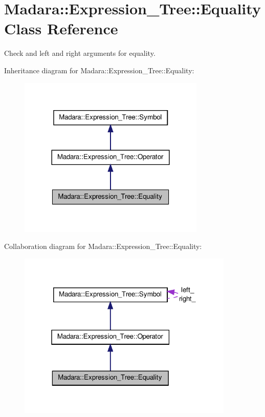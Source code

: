\hypertarget{classMadara_1_1Expression__Tree_1_1Equality}{
\section{Madara::Expression\_\-Tree::Equality Class Reference}
\label{de/df4/classMadara_1_1Expression__Tree_1_1Equality}
}


Check and left and right arguments for equality.  




Inheritance diagram for Madara::Expression\_\-Tree::Equality:
\nopagebreak
\begin{figure}[H]
\begin{center}
\leavevmode
\includegraphics[width=252pt]{d1/d15/classMadara_1_1Expression__Tree_1_1Equality__inherit__graph}
\end{center}
\end{figure}


Collaboration diagram for Madara::Expression\_\-Tree::Equality:
\nopagebreak
\begin{figure}[H]
\begin{center}
\leavevmode
\includegraphics[width=292pt]{d4/db3/classMadara_1_1Expression__Tree_1_1Equality__coll__graph}
\end{center}
\end{figure}
